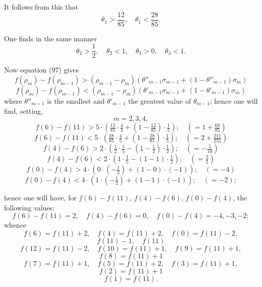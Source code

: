 \documentclass{article}
\begin{document}
It follows from this that
\[ \theta_1 > \frac{12}{85}, \quad \theta_1 < \frac{28}{85}. \]

One finds in the same manner
\[ \theta_2 > \frac{1}{2}, \quad \theta_2 < 1, \quad \theta_3 > 0, \quad \theta_3 < 1. \]

Now equation (97) gives
\[ f(\rho_m) - f(\rho_{m-1}) > (\rho_{m-1}-\rho_m)\left(\theta''_{m-1}\sigma_{m-1}+(1-\theta''_{m-1})\sigma_m\right) \]
\[ f(\rho_m) - f(\rho_{m-1}) < (\rho_{m-1}-\rho_m)\left(\theta'_{m-1}\sigma_{m-1}+(1-\theta'_{m-1})\sigma_m\right) \]
where $\theta''_{m-1}$ is the smallest and $\theta'_{m-1}$ the greatest value of $\theta_{m-1}$; hence one will find, setting,
\[ m = 2, 3, 4, \]
\[ f(6) - f(11) > 5 \cdot \left(\tfrac{12}{85} \cdot \tfrac{4}{3} + \left(1-\tfrac{12}{85}\right) \cdot \tfrac{1}{5}\right); \quad \left(= 1 + \tfrac{68}{85}\right) \]
\[ f(6) - f(11) < 5 \cdot \left(\tfrac{28}{85} \cdot \tfrac{4}{5} + \left(1-\tfrac{28}{85}\right) \cdot \tfrac{1}{5}\right); \quad \left(= 2 + \tfrac{211}{255}\right) \]
\[ f(4) - f(6) > 2 \cdot \left(\tfrac{1}{2} \cdot \tfrac{1}{5} - \left(1-\tfrac{1}{2}\right) \cdot \tfrac{1}{2}\right); \quad \left(= -\tfrac{5}{10}\right) \]
\[ f(4) - f(6) < 2 \cdot \left(1 \cdot \tfrac{1}{5} - (1-1) \cdot \tfrac{1}{2}\right); \quad \left(= \tfrac{2}{5}\right) \]
\[ f(0) - f(4) > 4 \cdot \left(0 \cdot \left(-\tfrac{1}{2}\right) + (1-0) \cdot (-1)\right); \quad (= -4) \]
\[ f(0) - f(4) < 4 \cdot \left(1 \cdot \left(-\tfrac{1}{2}\right) + (1-1) \cdot (-1)\right); \quad (= -2); \]

hence one will have, for $f(6)-f(11)$, $f(4)-f(6)$, $f(0)-f(4)$, the following values:
\[ f(6)-f(11) = 2, \quad f(4)-f(6) = 0, \quad f(0)-f(4) = -4, -3, -2; \]
whence
\[ f(6) = f(11)+2, \quad f(4) = f(11)+2, \quad f(0) = f(11)-2, \]
\[ f(11)-1, \quad f(11) \]
\[ f(12) = f(11)-2, \quad f(10) = f(11)+1, \quad f(9) = f(11)+1, \]
\[ f(8) = f(11)+1 \]
\[ f(7) = f(11)+1, \quad f(5) = f(11)+2, \quad f(3) = f(11)+1, \]
\[ f(2) = f(11)+1 \]
\[ f(1) = f(11). \]
\end{document}
